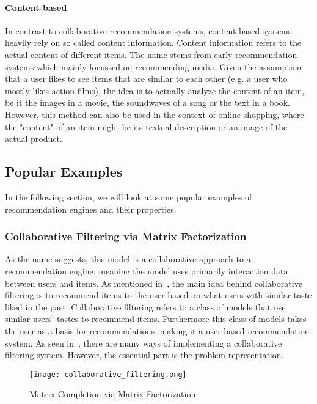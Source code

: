 \paragraph{Content-based}
In contrast to collaborative recommendation systems, content-based systems heavily rely on so called content information.
Content information refers to the actual content of different items.
The name stems from early recommendation systems which mainly focussed on recommending media.
Given the assumption that a user likes to see items that are similar to each other (e.g. a user who mostly likes action films), the idea is to actually analyze the content of an item, be it the images in a movie, the soundwaves of a song or the text in a book.
However, this method can also be used in the context of online shopping, where the "content" of an item might be its textual description or an image of the actual product.
\subsection{Popular Examples}
In the following section, we will look at some popular examples of recommendation engines and their properties.
\subsubsection{Collaborative Filtering via Matrix Factorization}
As the name suggests, this model is a collaborative approach to a recommendation engine, meaning the model uses primarily interaction data between users and items.
As mentioned in~\cite{intro_recsys}, the main idea behind collaborative filtering is to recommend items to the user based on what users with similar taste liked in the past.
Collaborative filtering refers to a class of models that use similar users' tastes to recommend items.
Furthermore this class of models takes the user as a basis for recommendations, making it a user-based recommendation system.
As seen in~\cite{collaborative_filtering}, there are many ways of implementing a collaborative filtering system.
However, the essential part is the problem representation.

\begin{figure}[t]
	\centering
	\captionsetup{width=0.8\textwidth}
    \texttt{[image: collaborative\_filtering.png]}
    \caption{Matrix Completion via Matrix Factorization}
    \label{fig:collaborative_filtering}
\end{figure}

